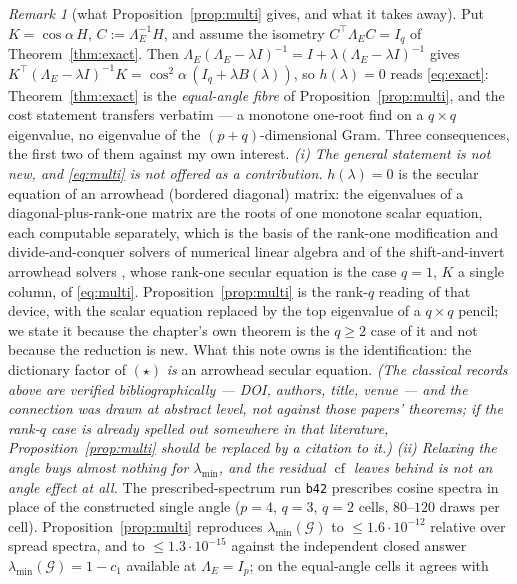 \documentclass[11pt]{article}
\theoremstyle{remark}
\newtheorem{remark}{Remark}[section]
\newcommand{\Gr}{\mathcal{G}}
\newcommand{\Le}{\Lambda_E}
\begin{document}
\begin{remark}[what Proposition~\ref{prop:multi} gives, and what it takes away]\label{rem:multi}
Put $K=\cos\alpha\,H$, $C:=\Le^{-1}H$, and assume the isometry $C^{\top}\Le C=I_q$ of
Theorem~\ref{thm:exact}. Then $\Le(\Le-\lambda I)^{-1}=I+\lambda(\Le-\lambda I)^{-1}$ gives
$K^{\top}(\Le-\lambda I)^{-1}K=\cos^{2}\alpha\,(I_q+\lambda B(\lambda))$, so $h(\lambda)=0$ reads
\eqref{eq:exact}: Theorem~\ref{thm:exact} is the \emph{equal-angle fibre} of
Proposition~\ref{prop:multi}, and the cost statement transfers verbatim --- a monotone one-root find
on a $q\times q$ eigenvalue, no eigenvalue of the $(p+q)$-dimensional Gram. Three consequences, the
first two of them against my own interest.
\emph{(i) The general statement is not new, and \eqref{eq:multi} is not offered as a contribution.}
$h(\lambda)=0$ is the secular equation of an arrowhead (bordered diagonal) matrix: the eigenvalues of
a diagonal-plus-rank-one matrix are the roots of one monotone scalar equation, each computable
separately, which is the basis of the rank-one modification and divide-and-conquer solvers of
numerical linear algebra \cite{bunch1978,cuppen1980,gu-eisenstat1995} and of the shift-and-invert
arrowhead solvers \cite{stor2013}, whose rank-one secular equation is
the case $q=1$, $K$ a single column, of \eqref{eq:multi}. Proposition~\ref{prop:multi} is the
rank-$q$ reading of that device, with the scalar equation replaced by the top eigenvalue of a
$q\times q$ pencil; we state it because the chapter's own theorem is the $q\ge2$ case of it and not
because the reduction is new. What this note owns is the identification: the dictionary factor of
$(\star)$ \emph{is} an arrowhead secular equation. \emph{(The classical records above are
verified bibliographically --- DOI, authors, title, venue --- and the connection was drawn at
abstract level, not against those papers' theorems; if the rank-$q$ case is already spelled out
somewhere in that literature, Proposition~\ref{prop:multi} should be replaced by a citation to it.)}
\emph{(ii) Relaxing the angle buys almost nothing for $\lambda_{\min}$, and the residual
$\operatorname{cf}$ leaves behind is not an angle effect at all.} The prescribed-spectrum run \texttt{b42} prescribes
cosine spectra in place of the constructed single angle ($p=4$, $q=3$, $q=2$ cells, $80$--$120$ draws
per cell).
Proposition~\ref{prop:multi} reproduces $\lambda_{\min}(\Gr)$ to $\le1.6\cdot10^{-12}$ relative over
spread spectra, and to $\le1.3\cdot10^{-15}$ against the independent closed answer
$\lambda_{\min}(\Gr)=1-c_1$ available at $\Le=I_p$; on the equal-angle cells it agrees with

\end{remark}
\end{document}
